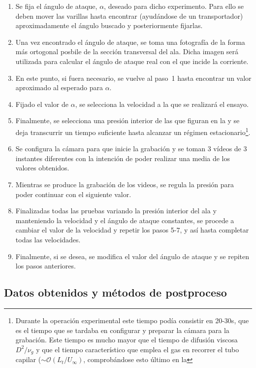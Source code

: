 \begin{enumerate}
\item Se fija el ángulo de ataque, $\alpha$, deseado para dicho experimento. Para ello se deben mover las varillas hasta encontrar (ayudándose de un transportador) aproximadamente el ángulo buscado y posteriormente fijarlas.
\item Una vez encontrado el ángulo de ataque, se toma una fotografía de la forma más ortogonal posbile de la sección transversal del ala. Dicha imagen será utilizada para calcular el ángulo de ataque real con el que incide la corriente.
\item En este punto, si fuera necesario, se vuelve al paso~1 hasta encontrar un valor aproximado al esperado para $\alpha$.
\item Fijado el valor de $\alpha$, se selecciona la velocidad a la que se realizará el ensayo.
\item Finalmente, se selecciona una presión interior de las que figuran en la  y se deja transcurrir un tiempo suficiente hasta alcanzar un régimen estacionario\footnote{Durante la operación experimental este tiempo podía consistir en 20-30s, que es el tiempo que se tardaba en configurar y preparar la cámara para la grabación. Este tiempo es mucho mayor que el tiempo de difusión viscosa $D^{2}/\nu_{g}$  y que el tiempo característico que emplea el gas en recorrer el tubo capilar ($\sim \mathcal{O}(L_{t}/U_{\infty})$, comprobándose esto último en la }.
\item Se configura la cámara para que inicie la grabación y se toman 3 vídeos de 3 instantes diferentes con la intención de poder realizar una media de los valores obtenidos.
\item Mientras se produce la grabación de los videos, se regula la presión para poder continuar con el siguiente valor.
\item Finalizadas todas las pruebas variando la presión interior del ala y manteniendo la velocidad y el ángulo de ataque constantes, se  procede a cambiar el valor de la velocidad y repetir los pasos 5-7, y así hasta completar todas las velocidades. 
\item Finalmente, si se desea, se modifica el valor del ángulo de ataque y se repiten los pasos anteriores.

\end{enumerate}


\subsection{Datos obtenidos y métodos de postproceso}

